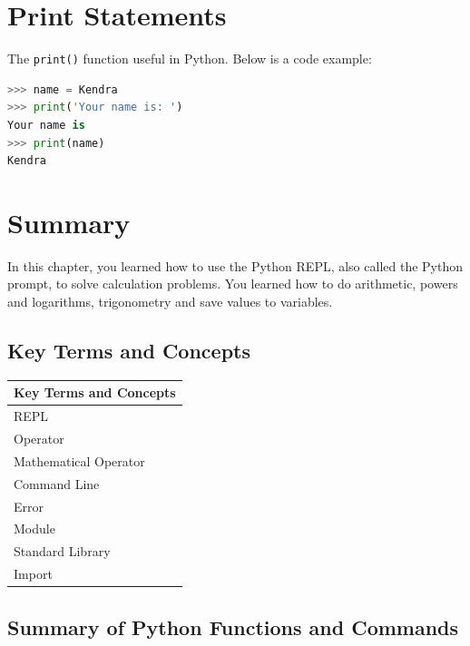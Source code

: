 \documentclass{book}
\begin{document}
    
        \section{Print Statements}\label{print-statements}
    




    
        The \lstinline!print()! function useful in Python. Below is a code
example:

\begin{lstlisting}[language=Python]
>>> name = Kendra
>>> print('Your name is: ')
Your name is
>>> print(name)
Kendra
\end{lstlisting}
    




    
        \section{Summary}\label{summary}
    




    
        In this chapter, you learned how to use the Python REPL, also called the
Python prompt, to solve calculation problems. You learned how to do
arithmetic, powers and logarithms, trigonometry and save values to
variables.
    




    
        \subsection{Key Terms and Concepts}\label{key-terms-and-concepts}

\begin{longtable}[]{@{}l@{}}
\toprule
Key Terms and Concepts\tabularnewline
\midrule
\endhead
REPL\tabularnewline
Operator\tabularnewline
Mathematical Operator\tabularnewline
Command Line\tabularnewline
Error\tabularnewline
Module\tabularnewline
Standard Library\tabularnewline
Import\tabularnewline
\bottomrule
\end{longtable}
    




    
        \subsection{Summary of Python Functions and
Commands}\label{summary-of-python-functions-and-commands}
\end{document}
